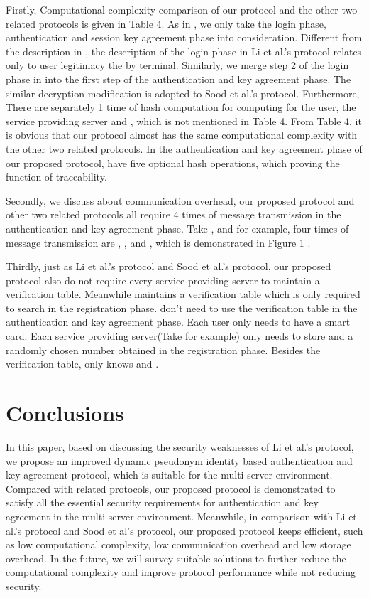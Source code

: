 \documentclass[preprint,12pt]{elsarticle}
\begin{document}
Firstly, Computational complexity comparison of our protocol and the other two related protocols is given in Table 4. As in \cite{passwd-based-multi7}, we only take the login phase, authentication and session key agreement phase into consideration. Different from the description in \cite{passwd-based-multi7}, the description of the login phase in Li et al.'s protocol relates only to user legitimacy the by terminal. Similarly, we merge step 2 of the login phase in \cite{passwd-based-multi7} into the first step of the authentication and key agreement phase. The similar decryption modification is adopted to Sood et al.'s protocol\cite{passwd-based-multi2}. Furthermore, There are separately 1 time of hash computation for computing  for the user, the service providing server and , which is not mentioned in Table 4. From Table 4, it is obvious that our protocol almost has the same computational complexity with the other two related protocols. In the authentication and key agreement phase of our proposed protocol,  have five optional hash operations, which proving the function of traceability.

Secondly, we discuss about communication overhead, our proposed protocol and other two related protocols all require 4 times of message transmission in the authentication and key agreement phase. Take ,  and  for example, four times of message transmission are , ,  and , which is demonstrated in Figure 1 .

Thirdly, just as Li et al.'s protocol and Sood et al.'s protocol, our proposed protocol also do not require every service providing server to maintain a verification table. Meanwhile  maintains a verification table which is only required to search in the registration phase.  don't need to use the verification table in the authentication and key agreement phase. Each user only needs to have a smart card. Each service providing server(Take  for example) only needs to store  and a randomly chosen number obtained in the registration phase. Besides the verification table,  only knows  and .


\section{Conclusions}
In this paper, based on discussing the security weaknesses of Li et al.'s protocol, we propose an improved dynamic pseudonym identity based authentication and key agreement protocol, which is suitable for the multi-server environment. Compared with related protocols, our proposed protocol is demonstrated to satisfy all the essential security requirements for authentication and key agreement in the multi-server environment. Meanwhile, in comparison with Li et al.'s protocol and Sood et al's protocol, our proposed protocol keeps efficient, such as low computational complexity, low communication overhead and low storage overhead. In the future, we will survey suitable solutions to further reduce the computational complexity and improve protocol performance while not reducing security.
\end{document}
